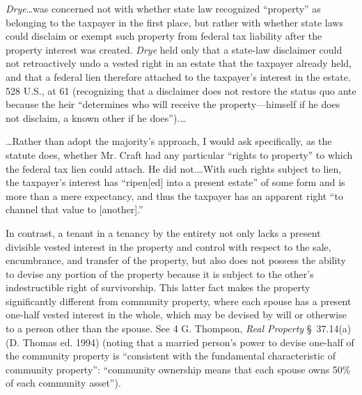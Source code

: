 \textit{Drye}\dots was concerned not with whether state law recognized
``property'' as belonging to the taxpayer in the first place, but rather with
whether state laws could disclaim or exempt such property from federal tax
liability after the property interest was created. \textit{Drye} held only
that a state-law disclaimer could not retroactively undo a vested right in an
estate that the taxpayer already held, and that a federal lien therefore
attached to the taxpayer's interest in the estate. 528 U.S., at 61 (recognizing
that a disclaimer does not restore the status quo ante because the heir
``determines who will receive the property---himself if he does not disclaim,
a known other if he does'').\dots


\dots Rather than adopt the majority's approach, I would ask specifically, as
the statute does, whether Mr. Craft had any particular ``rights to property''
to which the federal tax lien could attach. He did
not.\dots With such rights subject to lien, the
taxpayer's interest has ``ripen[ed] into a present estate'' of some form and is
more than a mere expectancy, and thus the taxpayer has an apparent right ``to
channel that value to [another].''

In contrast, a tenant in a tenancy by the entirety not only lacks a present
divisible vested interest in the property and control with respect to the sale,
encumbrance, and transfer of the property, but also does not possess the
ability to devise any portion of the property because it is subject to the
other's indestructible right of survivorship. This latter fact makes the
property significantly different from community property, where each spouse has
a present one-half vested interest in the whole, which may be devised by will
or otherwise to a person other than the spouse. See 4 G. Thompson, \emph{Real
Property} \S~37.14(a) (D. Thomas ed. 1994) (noting that a married person's
power to devise one-half of the community property is ``consistent with the
fundamental characteristic of community property'': ``community ownership means
that each spouse owns 50\% of each community asset'').

